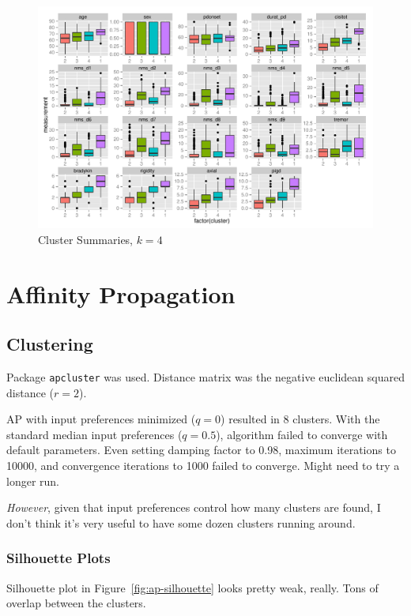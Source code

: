\documentclass[letterpaper,12pt]{article}
\begin{document}
\begin{figure}[h]
  \centering
  \includegraphics[width=\linewidth]{kmeans-summaries-4.pdf}
  \caption{Cluster Summaries, $k = 4$}
  \label{fig:kmeans-summaries-4}
\end{figure}

\clearpage
\section{Affinity Propagation}

\subsection{Clustering}

Package \texttt{apcluster} was used. Distance matrix was the negative euclidean
squared distance ($r = 2$).

AP with input preferences minimized ($q = 0$) resulted in 8 clusters.
With the standard median input preferences ($q = 0.5$), algorithm failed to
converge with default parameters. Even setting damping factor to 0.98, maximum
iterations to 10000, and convergence iterations to 1000 failed to converge.
Might need to try a longer run.

\emph{However}, given that input preferences control how many clusters are
found, I don't think it's very useful to have some dozen clusters running
around.

\subsubsection{Silhouette Plots}

Silhouette plot in Figure~\ref{fig:ap-silhouette} looks pretty weak, really.
Tons of overlap between the clusters.
\end{document}
